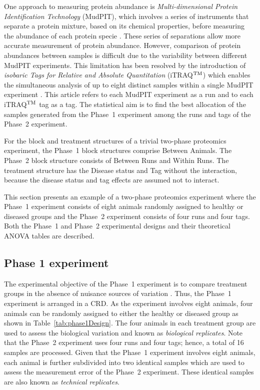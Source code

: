 \documentclass[article]{jss}
\begin{document}
One approach to measuring protein abundance is \emph{Multi-dimensional Protein Identification Technology} (MudPIT), which involves a series of instruments that separate a protein mixture, based on its chemical properties, before measuring the abundance of each protein specie \citep{Florens2006a}. These series of separations allow more accurate measurement of protein abundance. However, comparison of protein abundances between samples is difficult due to the variability between different MudPIT experiments. This limitation has been resolved by the introduction of \emph{isobaric Tags for Relative and Absolute Quantitation} (iTRAQ$^{\rm TM}$) which enables the simultaneous analysis of up to eight distinct samples within a single MudPIT experiment \citep{Ross2004, Choe2007}. This article refers to each MudPIT experiment as a run and to each iTRAQ$^{\rm TM}$ tag as a tag. The statistical aim is to find the best allocation of the samples generated from the Phase~1 experiment among the runs and tags of the Phase~2 experiment.

For the block and treatment structures of a trivial two-phase proteomics experiment, the Phase~1 block structures comprise Between Animals. The Phase~2 block structure consists of Between Runs and Within Runs. The treatment structure has the Disease status and Tag without the interaction, because the disease status and tag effects are assumed not to interact.

This section presents an example of a two-phase proteomics experiment where the Phase~1 experiment consists of eight animals randomly assigned to healthy or diseased groups and the Phase~2 experiment consists of four runs and four tags. Both the Phase~1 and Phase~2 experimental designs and their theoretical ANOVA tables are described.

\subsection{Phase 1 experiment}
\label{subsec:Phase1Exp}
The experimental objective of the Phase~1 experiment is to compare treatment groups in the absence of nuisance sources of variation \citep{Mead1988}. Thus, the Phase~1 experiment is arranged in a CRD. As the experiment involves eight animals, four animals can be randomly assigned to either the healthy or diseased group as shown in Table~\ref{tab:phase1Design}. The four animals in each treatment group are used to assess the biological variation and known as \emph{biological replicates}. Note that the Phase~2 experiment uses four runs and four tags; hence, a total of 16 samples are processed. Given that the Phase~1 experiment involves eight animals, each animal is further subdivided into two identical samples which are used to assess the measurement error of the Phase~2 experiment. These identical samples are also known as \emph{technical replicates}.
\end{document}
